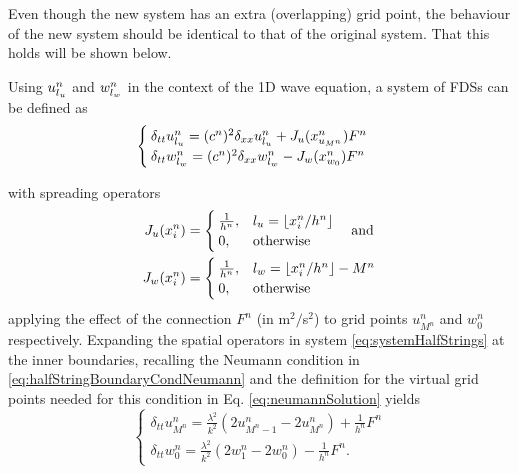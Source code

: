 Even though the new system has an extra (overlapping) grid point, the behaviour of the new system should be identical to that of the original system. That this holds will be shown below.

Using $u_{l_u}^n$ and $w_{l_w}^n$ in the context of the 1D wave equation, a system of FDSs can be defined as
\begin{equation}
    \begin{cases}\label{eq:systemHalfStrings}
        \delta_{tt}u_{l_u}^n = (c^n)^2\delta_{xx}u_{l_u}^n + J_u(x_{u_{M^n}}^n)F^n\\
        \delta_{tt}w_{l_w}^n = (c^n)^2\delta_{xx}w_{l_w}^n - J_w(x_{w_0}^n)F^n
    \end{cases}
\end{equation}

with spreading operators
\begin{equation}\label{eq:spreadingOperators}
    \begin{aligned}
    J_u(x_i^n)& =
    \begin{cases}
        \frac{1}{h^n}, & {l_u} = \lfloor x_i^n/h^n\rfloor\\
        0,& \text{otherwise}
    \end{cases}
    \quad\text{and}\\
    J_w(x_i^n) &=
    \begin{cases}
        \frac{1}{h^n}, & {l_w} = \lfloor x_i^n/h^n \rfloor - M^n\\
        0,& \text{otherwise}
    \end{cases}
\end{aligned}
\end{equation}
 applying the effect of the connection %
$F^n$ (in m$^2/$s$^2$) to grid points $u_{M^n}^n$ and $w_0^n$ respectively.
%
Expanding the spatial operators in system \eqref{eq:systemHalfStrings} at the inner boundaries, recalling the Neumann condition in  \eqref{eq:halfStringBoundaryCondNeumann} and the definition for the virtual grid points needed for this condition in Eq. \eqref{eq:neumannSolution} yields
\begin{equation}\label{eq:expandedSystem}
    \begin{cases}
        \delta_{tt}u_{M^n}^n = \frac{\lambda^2}{k^2}(2u_{M^n-1}^n-2u_{M^n}^n) + \frac{1}{h^n}F^n\\
        \delta_{tt}w_0^n = \frac{\lambda^2}{k^2}(2w_1^n-2w_0^n) - \frac{1}{h^n}F^n.
    \end{cases}
\end{equation}
